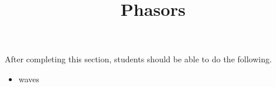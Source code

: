 \documentclass{ximera}
\title{Phasors}
\begin{document}
\begin{abstract}
\end{abstract}

\maketitle

\begin{sectionOutcomes}

After completing this section, students should be able to do the following.

\begin{itemize}
\item waves
\end{itemize}

\end{sectionOutcomes}
\end{document}
